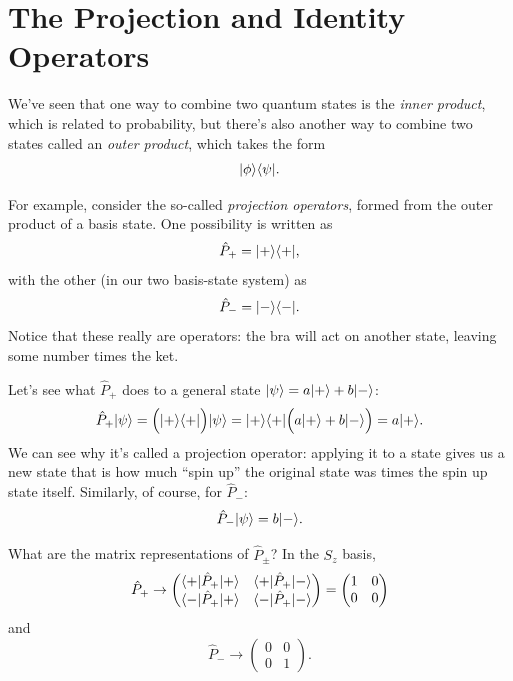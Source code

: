 \section{The Projection and Identity Operators}
\label{sec_proj_ident}

We've seen that one way to combine two quantum states is the \emph{inner product}, which is related to probability, but there's also another way to combine two states called an \emph{outer product}, which takes the form
\[
| \phi \rangle\langle \psi |.
\]

For example, consider the so-called \emph{projection operators}, formed from the outer product of a basis state.  One possibility is written as
\begin{equation}
\hat{P}_+ = | + \rangle \langle + |, 
\end{equation}
with the other (in our two basis-state system) as
\begin{equation}
\hat{P}_- = | - \rangle \langle - |.
\end{equation}
Notice that these really are operators:  the bra will act on another state, leaving some number times the ket.  

Let's see what $\hat{P}_+$ does to a general state $| \psi \rangle = a| + \rangle + b| - \rangle$:
\[
\hat{P}_+ | \psi \rangle = \Big( | + \rangle \langle + | \Big) | \psi \rangle = | + \rangle \langle + | \Big( a| + \rangle + b| - \rangle \Big) = a | + \rangle.
\]
We can see why it's called a projection operator:  applying it to a state gives us a new state that is how much ``spin up'' the original state was times the spin up state itself.  Similarly, of course, for $\hat{P}_-$:
\[
\hat{P}_- | \psi \rangle = b | - \rangle.
\]

What are the matrix representations of $\hat{P}_\pm$?  In the $S_z$ basis,
\begin{equation}
\hat{P}_+ \to 
\begin{pmatrix}
\langle + | \hat{P}_+ | + \rangle & \langle + | \hat{P}_+ | - \rangle \\
\langle - | \hat{P}_+ | + \rangle & \langle - | \hat{P}_+ | - \rangle
\end{pmatrix}
 = 
\begin{pmatrix}
1 & 0 \\ 0 & 0
\end{pmatrix}
\end{equation}
and
\begin{equation}
\hat{P}_- \to 
\begin{pmatrix}
0 & 0 \\ 0 & 1
\end{pmatrix}.
\end{equation}

